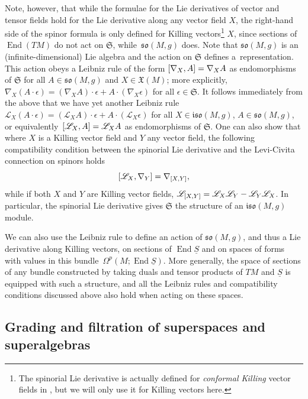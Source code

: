 \documentclass[11pt]{article}
\numberwithin{equation}{section}
\numberwithin{equation}{section}
\newcommand{\fso}{\mathfrak{so}}
\newcommand{\fiso}{\mathfrak{iso}}
\newcommand{\fX}{\mathfrak{X}}
\newcommand{\fS}{\mathfrak{S}}
\newcommand{\eL}{\mathscr{L}}
\newcommand{\Sbundle}{\underline{S}}
\newcommand{\1}{\mathbbm{1}}
\DeclareMathOperator{\End}{End}
\begin{document}
Note, however, that while the formulae for the Lie derivatives of vector and tensor fields hold for the Lie derivative along any vector field $X$, the right-hand side of the spinor formula is only defined for Killing vectors\footnote{The spinorial Lie derivative is actually defined for \emph{conformal Killing} vector fields in \cite{Kosmann1971}, but we will only use it for Killing vectors here.}
$X$, since sections of $\End(TM)$ do not act on $\fS$, while~$\fso(M,g)$ does. Note that $\fso(M,g)$ is an (infinite-dimensional) Lie algebra and the action on $\fS$ defines a~representation. This action obeys a Leibniz rule of the form $\comm{\nabla_X}{A}=\nabla_X A$ as endomorphisms of $\fS$ for all $A\in\fso(M,g)$ and $X\in\fX(M)$; more explicitly,
$\nabla_X (A\cdot\epsilon) = (\nabla_X A)\cdot\epsilon + A\cdot(\nabla_X \epsilon)
$
for all $\epsilon\in\fS$. It follows immediately from the above that we have yet another Leibniz rule~${\eL_X (A\cdot\epsilon) = (\eL_X A)\cdot\epsilon + A\cdot(\eL_X \epsilon)
}$
for all $X\in\fiso(M,g)$, $A\in\fso(M,g)$, or equivalently~${\comm{\eL_X}{A}=\eL_X A}$ as endomorphisms of $\fS$. One can also show that where $X$ is a Killing vector field and $Y$ any vector field, the following compatibility condition between the spinorial Lie derivative and the Levi-Civita connection on spinors holds
\begin{equation}\label{eq:lie-der-compat}
	\comm{\eL_X}{\nabla_Y} = \nabla_{\comm{X}{Y}},
\end{equation}
while if both $X$ and $Y$ are Killing vector fields,
$\eL_{\comm{X}{Y}} = \eL_X\eL_Y - \eL_Y\eL_X$.
In particular, the spinorial Lie derivative gives $\fS$ the structure of an $\fiso(M,g)$ module.

We can also use the Leibniz rule to define an action of $\fso(M,g)$, and thus a Lie derivative along Killing vectors, on sections of $\End\Sbundle$ and on spaces of forms with values in this bundle~$\Omega^p(M;\End\Sbundle)$. More generally, the space of sections of any bundle constructed by taking duals and tensor products of $TM$ and $\Sbundle$ is equipped with such a structure, and all the Leibniz rules and compatibility conditions discussed above also hold when acting on these spaces.


\subsection{Grading and filtration of superspaces and superalgebras}
\label{sec:grading-filtration-superspace}
\end{document}
